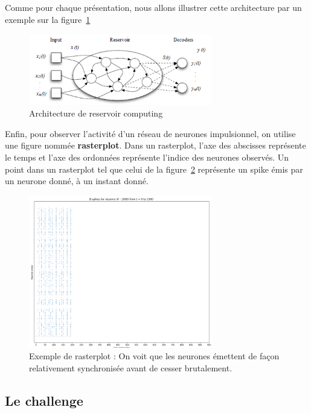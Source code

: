 Comme pour chaque présentation, nous allons illustrer cette architecture par un exemple sur la figure~\ref{reservoir}

\begin{figure}[h]
  \begin{center}
\includegraphics[width=8cm]{./images/Reservoir.png}
\end{center}
\caption{Architecture de reservoir computing}
\label{reservoir}
\end{figure}

Enfin, pour observer l'activité d'un réseau de neurones impulsionnel, on utilise une figure nommée \textbf{rasterplot}. Dans un rasterplot, l'axe des abscisses représente le temps et l'axe des ordonnées représente l'indice des neurones observés.
Un point dans un rasterplot tel que celui de la figure~\ref{principeRasterplot} représente un spike émis par un neurone donné, à un instant donné.

\begin{figure}[h]
  \begin{center}
  \includegraphics[width=8cm]{./images/SpikeB.png}
  \end{center}
  \caption{Exemple de rasterplot : On voit que les neurones émettent de façon relativement synchronisée avant de cesser brutalement.   }
  \label{principeRasterplot}
\end{figure}

\subsection{Le challenge}
\label{lechallenge}

